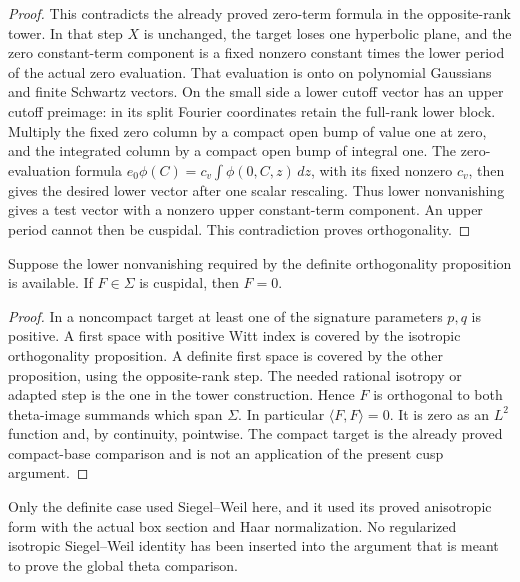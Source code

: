 \begin{proof}
This contradicts the already proved zero-term formula in the
opposite-rank tower. In that step \(X\) is unchanged, the target
loses one hyperbolic plane, and the zero constant-term component
is a fixed nonzero constant times the lower period of the
actual zero evaluation. That evaluation is onto on polynomial
Gaussians and finite Schwartz vectors. On the small side
a lower cutoff vector has an upper cutoff preimage: in its
split Fourier coordinates retain the full-rank lower block.
Multiply the fixed zero column by a compact open bump of
value one at zero, and the integrated column by a compact
open bump of integral one. The zero-evaluation formula
\(e_0\phi(C)=c_v\int\phi(0,C,z)\,dz\), with its fixed
nonzero \(c_v\), then gives the desired lower vector after
one scalar rescaling.
Thus lower nonvanishing gives a test vector with a nonzero
upper constant-term component. An upper period cannot then
be cuspidal. This contradiction proves orthogonality.
\end{proof}

\begin{srcorollary}
\label{cor:sr-theta-cuspidal-difference-zero}
Suppose the lower nonvanishing required by the definite
orthogonality proposition is available.
If \(F\in\Sigma\) is cuspidal, then \(F=0\).
\end{srcorollary}

\begin{proof}
In a noncompact target at least one of the signature parameters
\(p,q\) is positive. A first space with positive Witt index
is covered by the isotropic orthogonality proposition.
A definite first space is covered by the other proposition,
using the opposite-rank step. The needed rational isotropy
or adapted step is the one in the tower construction.
Hence \(F\) is orthogonal to both theta-image summands which
span \(\Sigma\). In particular \(\langle F,F\rangle=0\).
It is zero as an \(L^2\) function and, by continuity, pointwise.
The compact target is the already proved compact-base
comparison and is not an application of the present cusp
argument.
\end{proof}

Only the definite case used Siegel--Weil here, and it used its
proved anisotropic form with the actual box section and Haar
normalization. No regularized isotropic Siegel--Weil identity
has been inserted into the argument that is meant to prove
the global theta comparison.
